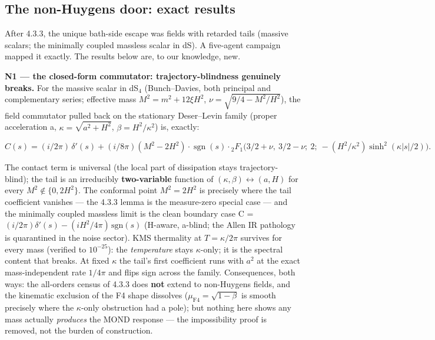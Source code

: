 \documentclass[11pt,a4paper]{article}
\begin{document}
\subsection{The non-Huygens door: exact results}

After 4.3.3, the unique bath-side escape was fields with retarded tails (massive scalars; the minimally coupled massless scalar in dS). A five-agent campaign mapped it exactly. The results below are, to our knowledge, new.

\textbf{N1 --- the closed-form commutator: trajectory-blindness genuinely breaks.} For the massive scalar in dS$_4$ (Bunch--Davies, both principal and complementary series; effective mass $M^2 = m^2 + 12\xi H^2$, $\nu = \sqrt{9/4 - M^2/H^2}$), the field commutator pulled back on the stationary Deser--Levin family (proper acceleration a, $\kappa = \sqrt{a^2+H^2}$, $\beta = H^2/\kappa^2$) is, exactly:

\begin{equation*}
C(s) = (i/2\pi)\,\delta'(s) + (i/8\pi)(M^2 - 2H^2)\cdot\operatorname{sgn}(s)\cdot{}_2F_1\!\bigl(3/2+\nu,\ 3/2-\nu;\ 2;\ -(H^2/\kappa^2)\sinh^2(\kappa|s|/2)\bigr).
\end{equation*}

The contact term is universal (the local part of dissipation stays trajectory-blind); the tail is an irreducibly \textbf{two-variable} function of $(\kappa, \beta) \longleftrightarrow (a, H)$ for every $M^2 \notin \{0, 2H^2\}$. The conformal point $M^2 = 2H^2$ is precisely where the tail coefficient vanishes --- the 4.3.3 lemma is the measure-zero special case --- and the minimally coupled massless limit is the clean boundary case C = $(i/2\pi)\delta'(s) - (iH^2/4\pi)\,\mathrm{sgn}(s)$ (H-aware, a-blind; the Allen IR pathology is quarantined in the noise sector). KMS thermality at $T = \kappa/2\pi$ survives for every mass (verified to $10^{-25}$): the \emph{temperature} stays $\kappa$-only; it is the spectral content that breaks. At fixed $\kappa$ the tail's first coefficient runs with $a^{2}$ at the exact mass-independent rate $1/4\pi$ and flips sign across the family. Consequences, both ways: the all-orders census of 4.3.3 does \textbf{not} extend to non-Huygens fields, and the kinematic exclusion of the F4 shape dissolves ($\mu_{\mathrm{F4}} = \sqrt{1-\beta}$ is smooth precisely where the $\kappa$-only obstruction had a pole); but nothing here shows any mass actually \emph{produces} the MOND response --- the impossibility proof is removed, not the burden of construction.
\end{document}
